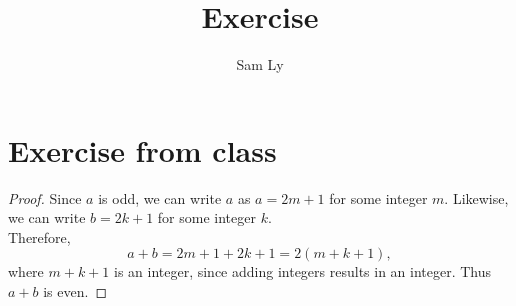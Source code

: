 \documentclass{article}
\title{Exercise}
\author{Sam Ly}
\begin{document}
\maketitle

\section*{Exercise from class}

\begin{proof}
    Since \(a\) is odd, we can write $a$ as \(a = 2m + 1\) for some integer \(m\).
    Likewise, we can write \(b = 2k + 1\) for some integer \(k\). 
    \\ Therefore,
    \[
        a + b = 2m + 1 + 2k + 1 = 2(m + k + 1),
    \]
    where \(m + k + 1\) is an integer, since adding integers results in an integer.
    Thus \(a + b\) is even.

\end{proof}
\end{document}
